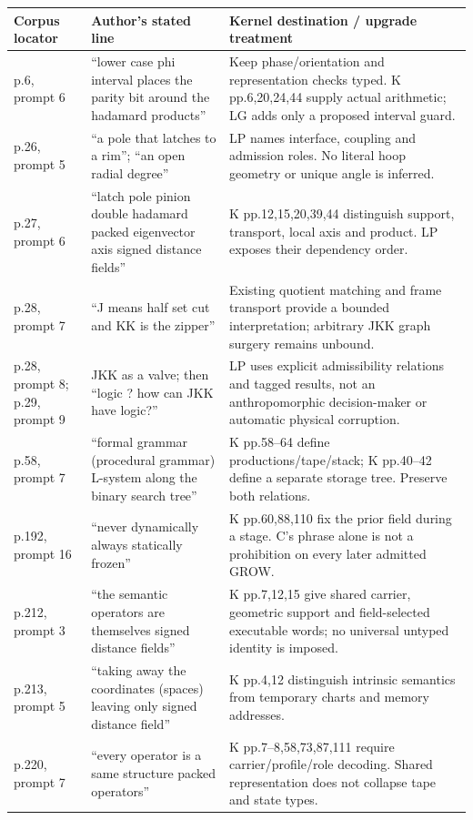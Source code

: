 \documentclass[11pt,a4paper]{article}
\theoremstyle{lpstyle}
\begin{document}
\begin{longtable}{L{25mm}L{67mm}L{61mm}}
\toprule
\textbf{Corpus locator}&\textbf{Author's stated line}&\textbf{Kernel destination / upgrade treatment}\\\midrule\endhead
p.6, prompt 6&``lower case phi interval places the parity bit around the hadamard products''&Keep phase/orientation and representation checks typed. K pp.6,20,24,44 supply actual arithmetic; LG adds only a proposed interval guard.\\
p.26, prompt 5&``a pole that latches to a rim''; ``an open radial degree''&LP names interface, coupling and admission roles. No literal hoop geometry or unique angle is inferred.\\
p.27, prompt 6&``latch pole pinion double hadamard packed eigenvector axis signed distance fields''&K pp.12,15,20,39,44 distinguish support, transport, local axis and product. LP exposes their dependency order.\\
p.28, prompt 7&``J means half set cut and KK is the zipper''&Existing quotient matching and frame transport provide a bounded interpretation; arbitrary JKK graph surgery remains unbound.\\
p.28, prompt 8; p.29, prompt 9&JKK as a valve; then ``logic ? how can JKK have logic?''&LP uses explicit admissibility relations and tagged results, not an anthropomorphic decision-maker or automatic physical corruption.\\
p.58, prompt 7&``formal grammar (procedural grammar) L-system along the binary search tree''&K pp.58--64 define productions/tape/stack; K pp.40--42 define a separate storage tree. Preserve both relations.\\
p.192, prompt 16&``never dynamically always statically frozen''&K pp.60,88,110 fix the prior field during a stage. C's phrase alone is not a prohibition on every later admitted GROW.\\
p.212, prompt 3&``the semantic operators are themselves signed distance fields''&K pp.7,12,15 give shared carrier, geometric support and field-selected executable words; no universal untyped identity is imposed.\\
p.213, prompt 5&``taking away the coordinates (spaces) leaving only signed distance field''&K pp.4,12 distinguish intrinsic semantics from temporary charts and memory addresses.\\
p.220, prompt 7&``every operator is a same structure packed operators''&K pp.7--8,58,73,87,111 require carrier/profile/role decoding. Shared representation does not collapse tape and state types.\\

\end{longtable}
\end{document}
